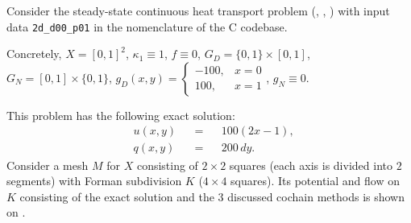 \begin{example}
  Consider the steady-state continuous heat transport problem 
  (,
   ,
   )
  with input data \verb|2d_d00_p01| in the nomenclature of the C codebase.

  Concretely, $X = [0, 1]^2$, $\kappa_1 \equiv 1$, $f \equiv 0$,
  $G_D = \{0, 1\} \times [0, 1]$, $G_N = [0, 1] \times \{0, 1\}$,
  $g_D(x, y) = \begin{cases} -100, & x = 0 \\ 100, & x = 1 \end{cases}$,
  $g_N \equiv 0$.

  This problem has the following exact solution:
  \begin{subequations}
    \begin{alignat}{3}
      & u(x, y) && = && 100 (2 x - 1), \\
      & q(x, y) && = && 200\, d y.
    \end{alignat}
  \end{subequations}
  Consider a mesh $M$ for $X$ consisting of $2 \times 2$ squares (each axis is
  divided into $2$ segments) with Forman subdivision $K$ ($4 \times 4$ squares).
  Its potential and flow on $K$ consisting of the exact solution and the $3$
  discussed cochain methods is shown on
  .
\end{example}
